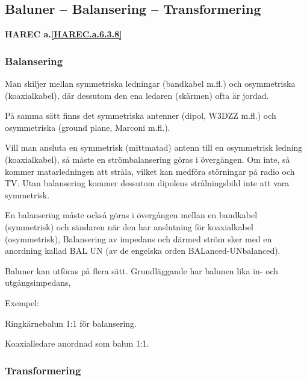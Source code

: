 \subsection{Baluner -- Balansering -- Transformering}
\textbf{
HAREC a.\ref{HAREC.a.6.3.8}\label{myHAREC.a.6.3.8}
}

\subsubsection{Balansering}

Man skiljer mellan symmetriska ledningar (bandkabel m.fl.) och
osymmetriska (koaxialkabel), där dessutom den ena ledaren (skärmen)
ofta är jordad.

På samma sätt finns det symmetriska antenner (dipol, W3DZZ m.fl.) och
osymmetriska (ground plane, Marconi m.fl.).

Vill man ansluta en symmetrisk (mittmatad) antenn till en osymmetrisk
ledning (koaxialkabel), så måste en strömbalansering göras i
övergången. Om inte, så kommer matarledningen att stråla, vilket kan
medföra störningar på radio och TV. Utan balansering kommer dessutom
dipolens strålningsbild inte att vara symmetrisk.

En balansering måste också göras i övergången mellan en bandkabel
(symmetrisk) och sändaren när den har anslutning för koaxialkabel
(osymmetrisk), Balansering av impedans och därmed ström sker med en
anordning kallad BAL UN (av de engelska orden BALanced-UNbalanced).

Baluner kan utföras på flera sätt. Grundläggande har balunen lika in-
och utgångsimpedans,

Exempel:

Ringkärnebalun 1:1 för balansering.

Koaxialledare anordnad som balun 1:1.

\subsubsection{Transformering}

